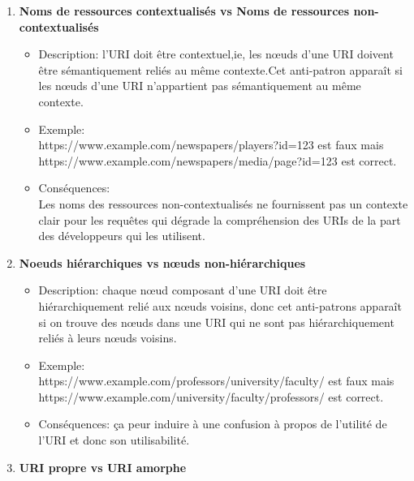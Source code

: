 \begin{enumerate}
    

\item \textbf{Noms de ressources contextualisés vs Noms de ressources non-contextualisés}
\begin{itemize}
    

\item {Description}: l’URI doit être contextuel,ie, les nœuds d’une URI doivent être sémantiquement reliés au même contexte.Cet anti-patron apparaît si les nœuds d’une URI n’appartient pas sémantiquement au même contexte.
\item Exemple: \\
https://www.example.com/newspapers/players?id=123  est faux mais \\
https://www.example.com/newspapers/media/page?id=123 est correct.
\item Conséquences:\\
Les noms des ressources non-contextualisés ne fournissent pas un contexte clair pour les requêtes qui dégrade la compréhension des URIs de la part des développeurs qui les utilisent.
\end{itemize}

\item \textbf{Noeuds hiérarchiques vs nœuds non-hiérarchiques}
\begin{itemize}
    

\item Description: chaque nœud composant d’une URI doit être hiérarchiquement relié aux nœuds voisins, donc cet anti-patrons apparaît si on trouve des nœuds dans une URI qui ne sont pas hiérarchiquement reliés  à leurs nœuds voisins.
\item Exemple:\\
https://www.example.com/professors/university/faculty/ est faux mais\\ https://www.example.com/university/faculty/professors/ est correct.
\item Conséquences: ça peur induire à une confusion à propos de l’utilité de l’URI et donc son utilisabilité.
\end{itemize}
\item \textbf{URI propre vs URI amorphe}
\begin{itemize}
    


\end{itemize}
\end{enumerate}
